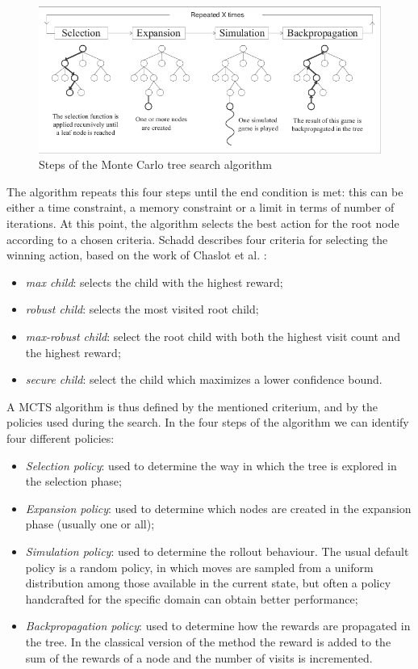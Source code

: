 \begin{figure}[ht]
\begin{center}
\includegraphics[width=\textwidth]{pictures/MCTSsteps.png}
\end{center}
\caption[MCTS steps]{Steps of the Monte Carlo tree search algorithm \cite{article}}
\label{fig:MCTSsteps}
\end{figure}

\medskip\noindent
The algorithm repeats this four steps until the end condition is met: this can be either a time constraint, a memory constraint or a limit in terms of number of iterations. At this point, the algorithm selects the best action for the root node according to a chosen criteria. Schadd \cite{bestcriteria} describes four
criteria for selecting the winning action, based on the work of
Chaslot et al. \cite{article}:
\begin{itemize}
    \item \textit{max child}: selects the child with the highest reward;
    \item \textit{robust child}: selects the most visited root child;
    \item \textit{max-robust child}: select the root child with both the highest visit count and the highest reward;
    \item \textit{secure child}: select the child which maximizes a lower confidence bound.
\end{itemize}
A MCTS algorithm is thus defined by the mentioned criterium, and by the policies used during the search. In the four steps of the algorithm we can identify four different policies:
\begin{itemize}
    \item \textit{Selection policy}: used to determine the way in which the tree is explored in the selection phase;
    \item \textit{Expansion policy}: used to determine which nodes are created in the expansion phase (usually one or all);
    \item \textit{Simulation policy}: used to determine the rollout behaviour. The usual default policy is a random policy, in which moves are sampled from a uniform distribution among those available in the current state, but often a policy handcrafted for the specific domain can obtain better performance;
    \item \textit{Backpropagation policy}: used to determine how the rewards are propagated in the tree. In the classical version of the method the reward is added to the sum of the rewards of a node and the number of visits is incremented.
\end{itemize}

